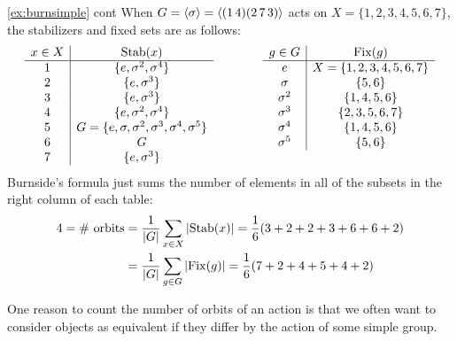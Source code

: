 \begin{example*}{\ref{ex:burnsimple} cont}{}
	When $G=\left\langle \sigma\right\rangle=\left\langle (1\,4)(2\,7\,3)\right\rangle$ acts on $X=\{1,2,3,4,5,6,7\}$, the stabilizers and fixed sets are as follows:
	\[
		\begin{array}{c|c}
			x\in X&\Stab(x)\\\hline
			1&\{e,\sigma^2,\sigma^4\}\\
			2&\{e,\sigma^3\}\\
			3&\{e,\sigma^3\}\\
			4&\{e,\sigma^2,\sigma^4\}\\
			5&G=\{e,\sigma,\sigma^2,\sigma^3,\sigma^4,\sigma^5\}\\
			6&G\\
			7&\{e,\sigma^3\}
		\end{array}
		\qquad\qquad
		\begin{array}{c|c}
			g\in G&\Fix(g)\\\hline
			e&X=\{1,2,3,4,5,6,7\}\\
			\sigma&\{5,6\}\\
			\sigma^2&\{1,4,5,6\}\\
			\sigma^3&\{2,3,5,6,7\}\\
			\sigma^4&\{1,4,5,6\}\\
			\sigma^5&\{5,6\}\\
			\multicolumn{2}{c}{}
		\end{array}
	\]
	Burnside's formula just sums the number of elements in all of the subsets in the right column of each table:
	\begin{align*}
		4=\text{\# orbits}
		&=\frac{1}{\left| G\right|}\sum_{x\in X}\left| \operatorname{Stab}(x)\right|
			=\frac{1}{6}(3+2+2+3+6+6+2)\\
		&=\frac{1}{\left| G\right|}\sum_{g\in G}\left| \operatorname{Fix}(g)\right|
			=\frac{1}{6}(7+2+4+5+4+2)
	\end{align*}
\end{example*}

\goodbreak

One reason to count the number of orbits of an action is that we often want to consider objects as equivalent if they differ by the action of some simple group.

